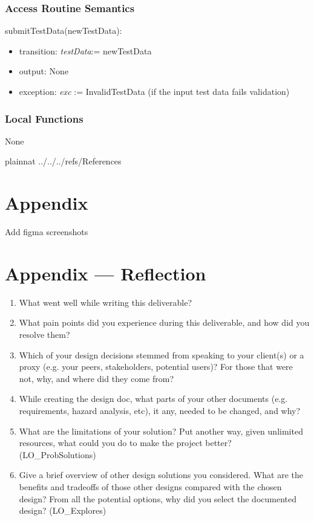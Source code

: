 \documentclass[12pt, titlepage]{article}
\begin{document}
\subsubsection{Access Routine Semantics}

\noindent submitTestData(newTestData):
\begin{itemize}
\item transition: \textit{testData}:= newTestData
\item output: None
\item exception: \textit{exc} := InvalidTestData (if the input test data fails validation)
\end{itemize}

\subsubsection{Local Functions}

None

\newpage


 {plainnat}
 {../../../refs/References}

\newpage

\section{Appendix} \label{Appendix}

Add figma screenshots




\newpage{}

\section*{Appendix --- Reflection}

\begin{enumerate}
  \item What went well while writing this deliverable? 
  \item What pain points did you experience during this deliverable, and how
    did you resolve them?
  \item Which of your design decisions stemmed from speaking to your client(s)
  or a proxy (e.g. your peers, stakeholders, potential users)? For those that
  were not, why, and where did they come from?
  \item While creating the design doc, what parts of your other documents (e.g.
  requirements, hazard analysis, etc), it any, needed to be changed, and why?
  \item What are the limitations of your solution?  Put another way, given
  unlimited resources, what could you do to make the project better? (LO\_ProbSolutions)
  \item Give a brief overview of other design solutions you considered.  What
  are the benefits and tradeoffs of those other designs compared with the chosen
  design?  From all the potential options, why did you select the documented design?
  (LO\_Explores)
\end{enumerate}
\end{document}
